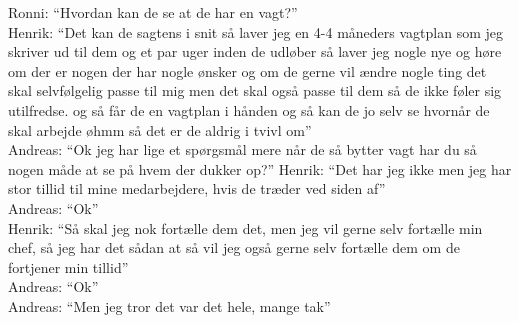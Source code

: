 Ronni: “Hvordan kan de se at de har en vagt?”\\
Henrik: “Det kan de sagtens i snit så laver jeg en 4-4 måneders vagtplan som jeg skriver ud til dem og et par uger inden de udløber så laver jeg nogle nye og høre om der er nogen der har nogle ønsker og om de gerne vil ændre nogle ting det skal selvfølgelig passe til mig men det skal også passe til dem så de ikke føler sig utilfredse. og så får de en vagtplan i hånden og så kan de jo selv se hvornår de skal arbejde øhmm så det er de aldrig i tvivl om”\\
Andreas: “Ok jeg har lige et spørgsmål mere når de så bytter vagt har du så nogen måde at se på hvem der dukker op?”
Henrik: “Det har jeg ikke men jeg har stor tillid til mine medarbejdere, hvis de træder ved siden af”\\
Andreas: “Ok”\\
Henrik: “Så skal jeg nok fortælle dem det, men jeg vil gerne selv fortælle min chef, så jeg har det sådan at så vil jeg også gerne selv fortælle dem om de fortjener min tillid”\\
Andreas: “Ok”\\
Andreas: “Men jeg tror det var det hele, mange tak”\\


